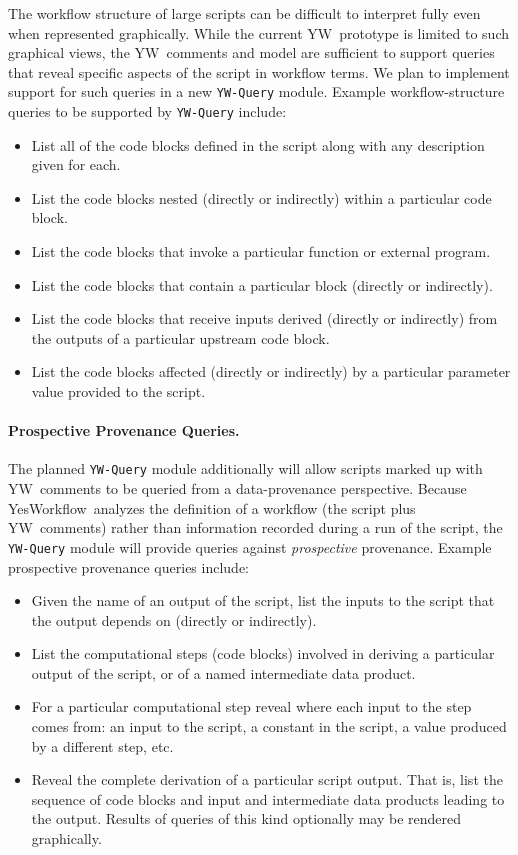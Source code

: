 \documentclass{article}
\newcommand{\YW}{\textsf{YesWorkflow}}
\newcommand{\yw}{\textsf{YW}}
\newcommand{\ywm}[1]{\texttt{#1}}
\begin{document}
The workflow structure of large scripts can be difficult to interpret
fully even when represented graphically.  While the current \yw\
prototype is limited to such graphical views, the \yw\ comments and
model are sufficient to support queries that reveal specific aspects
of the script in workflow terms.  We plan to implement support for
such queries in a new \ywm{YW-Query} module.  Example
workflow-structure queries to be supported by \ywm{YW-Query} include:
%
\begin{itemize}
\item List all of the code blocks defined in the script along with any description given for each.
\item List the code blocks nested (directly or indirectly) within a particular code block.
\item List the code blocks that invoke a particular function or external program.
\item List the code blocks that contain a particular block (directly or indirectly).
\item List the code blocks that receive inputs derived (directly or indirectly) from the outputs of a particular upstream code block.
\item List the code blocks affected (directly or indirectly) by a particular parameter value provided to the script.
\end{itemize}

\paragraph{Prospective Provenance Queries.}
The planned \ywm{YW-Query} module additionally will allow scripts
marked up with \yw\ comments to be queried from a data-provenance
perspective. Because \YW\ analyzes the definition of a workflow (the
script plus \yw\ comments) rather than information recorded during a
run of the script, the \ywm{YW-Query} module will provide queries
against \emph{prospective} provenance.
%
Example prospective provenance queries include:
\begin{itemize}
\item Given the name of an output of the script, list the inputs to
  the script that the output depends on (directly or indirectly). 
\item List the computational steps (code blocks) involved in deriving
  a particular output of the script, or of a named intermediate data
  product. 
\item For a particular computational step reveal where each input to
  the step comes from: an input to the script, a constant in the
  script, a value produced by a different step, etc. 
\item Reveal the complete derivation of a particular script output.
  That is, list the sequence of code blocks and input and intermediate
  data products leading to the output. Results of queries of this kind
  optionally may be rendered graphically. 
\end{itemize}
\end{document}
